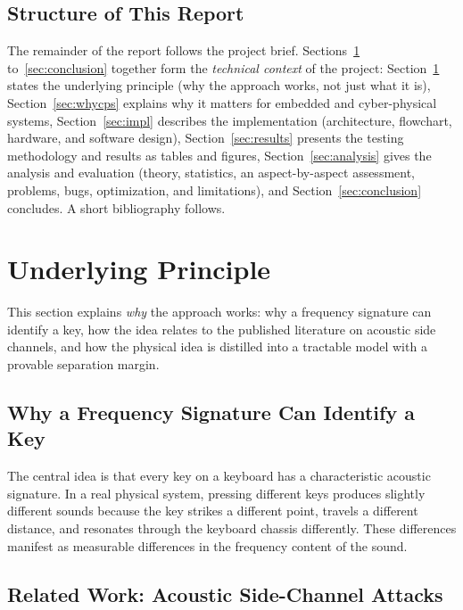 \documentclass[11pt,a4paper]{article}
\begin{document}
\subsection{Structure of This Report}

The remainder of the report follows the project brief. Sections~\ref{sec:principle}
to~\ref{sec:conclusion} together form the \emph{technical context} of the
project: Section~\ref{sec:principle} states the underlying principle (why the
approach works, not just what it is), Section~\ref{sec:whycps} explains why it
matters for embedded and cyber-physical systems, Section~\ref{sec:impl}
describes the implementation (architecture, flowchart, hardware, and software
design), Section~\ref{sec:results} presents the testing methodology and results
as tables and figures, Section~\ref{sec:analysis} gives the analysis and
evaluation (theory, statistics, an aspect-by-aspect assessment, problems, bugs,
optimization, and limitations), and Section~\ref{sec:conclusion} concludes. A
short bibliography follows.

\section{Underlying Principle}
\label{sec:principle}

This section explains \emph{why} the approach works: why a frequency signature
can identify a key, how the idea relates to the published literature on acoustic
side channels, and how the physical idea is distilled into a tractable model
with a provable separation margin.

\subsection{Why a Frequency Signature Can Identify a Key}

The central idea is that every key on a keyboard has a characteristic acoustic
signature. In a real physical system, pressing different keys produces slightly
different sounds because the key strikes a different point, travels a different
distance, and resonates through the keyboard chassis differently. These
differences manifest as measurable differences in the frequency content of the
sound.

\subsection{Related Work: Acoustic Side-Channel Attacks}
\label{sec:related-bg}
\end{document}
